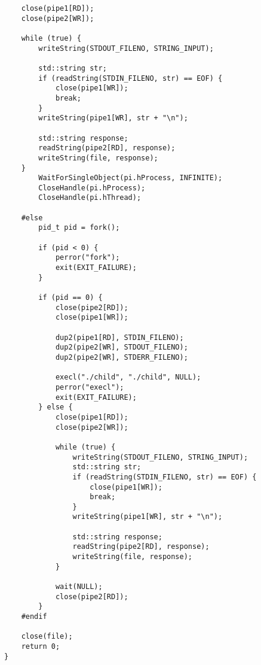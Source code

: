 \documentclass[14pt,a4paper]{extarticle}
\begin{document}
\begin{small}
\begin{verbatim}
    close(pipe1[RD]);
    close(pipe2[WR]);
    
    while (true) {
        writeString(STDOUT_FILENO, STRING_INPUT);
       
        std::string str;
        if (readString(STDIN_FILENO, str) == EOF) {
            close(pipe1[WR]);
            break;
        }
        writeString(pipe1[WR], str + "\n");

        std::string response;
        readString(pipe2[RD], response); 
        writeString(file, response);
    }
        WaitForSingleObject(pi.hProcess, INFINITE);
        CloseHandle(pi.hProcess);
        CloseHandle(pi.hThread);

    #else
        pid_t pid = fork();

        if (pid < 0) {
            perror("fork");
            exit(EXIT_FAILURE);
        }

        if (pid == 0) {
            close(pipe2[RD]);
            close(pipe1[WR]);

            dup2(pipe1[RD], STDIN_FILENO);
            dup2(pipe2[WR], STDOUT_FILENO); 
            dup2(pipe2[WR], STDERR_FILENO);  

            execl("./child", "./child", NULL);
            perror("execl");
            exit(EXIT_FAILURE);
        } else {
            close(pipe1[RD]);
            close(pipe2[WR]);
            
            while (true) {
                writeString(STDOUT_FILENO, STRING_INPUT);
                std::string str;
                if (readString(STDIN_FILENO, str) == EOF) {
                    close(pipe1[WR]);
                    break;
                }
                writeString(pipe1[WR], str + "\n");
                
                std::string response;
                readString(pipe2[RD], response);
                writeString(file, response);
            }
            
            wait(NULL);
            close(pipe2[RD]);
        }
    #endif

    close(file);
    return 0;
}
\end{verbatim}
\end{small}
\end{document}
